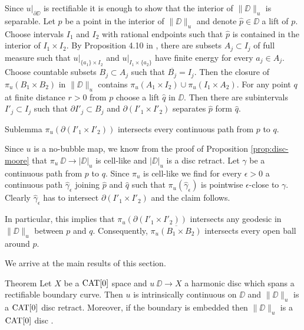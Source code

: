 \documentclass[a4paper,10pt]{amsart}
\begin{document}
Since $u|_{\partial \DD}$ is rectifiable it is enough to show that 
the interior of $\|\DD\|_u$ is separable. Let $p$ be a point in the interior of $\|\DD\|_u$ and denote $\hat p\in\DD$ 
a lift of $p$. Choose intervals $I_1$ and $I_2$ with rational endpoints such that $\hat p$ is contained in the interior of $I_1\times I_2$.
By Proposition 4.10 in \cite{LW}, there are subsets $A_j\subset I_j$ of full measure such that $u|_{\{a_1\}\times I_2}$
and $u|_{I_1\times \{a_2\}}$ have finite energy for every $a_j\in A_j$. Choose countable subsets $B_j\subset A_j$
such that $\overline{B_j}=I_j$. Then the closure of $\pi_u(B_1\times B_2)$ in $\|\DD\|_u$ contains 
$\pi_u(A_1\times I_2)\cup \pi_u(I_1\times A_2)$.
For any point $q$ at finite distance $r>0$ from $p$ choose a lift $\hat q$ in $\DD$. Then there are subintervals $I'_j\subset I_j$
such that $\partial I'_j\subset B_j$ and $\partial( I'_1\times I'_2)$ separates $\hat p$ form $\hat q$.
\begin{thm}{Sublemma}\label{sublem:separating}
$\pi_u(\partial( I'_1\times I'_2))$ intersects every continuous path from $p$ to $q$.
\end{thm}

Since $u$ is a no-bubble map, we know from the proof of Proposition \ref{prop:disc-moore} that $\pi_u\:\DD\to|\DD|_u$ is cell-like and 
$|\DD|_u$ is a disc retract. 
Let $\gamma$ be a continuous path from $p$ to $q$. Since $\pi_u$ is cell-like we find for every $\epsilon>0$ a continuous path $\hat\gamma_\epsilon$ joining $\hat p$
and $\hat q$ such that $\pi_u(\hat\gamma_\epsilon)$ is pointwise $\epsilon$-close to $\gamma$. Clearly $\hat\gamma_\epsilon$ has to intersect 
$\partial( I'_1\times I'_2)$ and the claim follows.
\qeds

In particular, this implies that $\pi_u(\partial( I'_1\times I'_2))$ intersects any geodesic in $\|\DD\|_u$ between $p$ and $q$. 
Consequently, $\overline{\pi_u(B_1\times B_2)}$ intersects every open ball around $p$.
\qeds





We arrive at the main results of this section.


\begin{thm}{Theorem}\label{thm:harmonic}
Let $X$ be a $\mathop{\rm CAT}\nolimits[0]$ space 
and $u\:\DD\to X$ a harmonic disc which spans a rectifiable boundary curve. 
Then $u$ is intrinsically continuous on $\DD$ and $\|\DD\|_u$ is a $\mathop{\rm CAT}\nolimits[0]$ disc retract. 
Moreover, if the boundary is embedded then $\|\DD\|_u$ is a $\mathop{\rm CAT}\nolimits[0]$ disc .
\end{thm}
\end{document}
